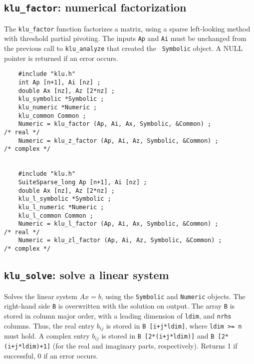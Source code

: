 \documentclass[11pt]{article}
\begin{document}
\subsection{{\tt klu\_factor}: numerical factorization}

The {\tt klu\_factor} function factorizes a matrix, using a sparse left-looking
method with threshold partial pivoting.  The inputs {\tt Ap} and {\tt Ai} must
be unchanged from the previous call to {\tt klu\_analyze} that created the {\tt
Symbolic} object.  A NULL pointer is returned if an error occurs.

{\footnotesize
\begin{verbatim}
    #include "klu.h"
    int Ap [n+1], Ai [nz] ;
    double Ax [nz], Az [2*nz] ;
    klu_symbolic *Symbolic ;
    klu_numeric *Numeric ;
    klu_common Common ;
    Numeric = klu_factor (Ap, Ai, Ax, Symbolic, &Common) ;                            /* real */
    Numeric = klu_z_factor (Ap, Ai, Az, Symbolic, &Common) ;                          /* complex */


    #include "klu.h"
    SuiteSparse_long Ap [n+1], Ai [nz] ;
    double Ax [nz], Az [2*nz] ;
    klu_l_symbolic *Symbolic ;
    klu_l_numeric *Numeric ;
    klu_l_common Common ;
    Numeric = klu_l_factor (Ap, Ai, Ax, Symbolic, &Common) ;                          /* real */
    Numeric = klu_zl_factor (Ap, Ai, Az, Symbolic, &Common) ;                         /* complex */
\end{verbatim}
}

\subsection{{\tt klu\_solve}: solve a linear system}

Solves the linear system $Ax=b$, using the {\tt Symbolic} and  {\tt Numeric}
objects.  The right-hand side {\tt B} is overwritten with the solution on
output.  The array {\tt B} is stored in column major order, with a leading
dimension of {\tt ldim}, and {\tt nrhs} columns.  Thus, the real entry $b_{ij}$
is stored in {\tt B [i+j*ldim]}, where {\tt ldim >= n} must hold.  A complex
entry $b_{ij}$ is stored in {\tt B [2*(i+j*ldim)]} and {\tt B [2*(i+j*ldim)+1]}
(for the real and imaginary parts, respectively).  Returns 1 if successful,
0 if an error occurs.
\end{document}
